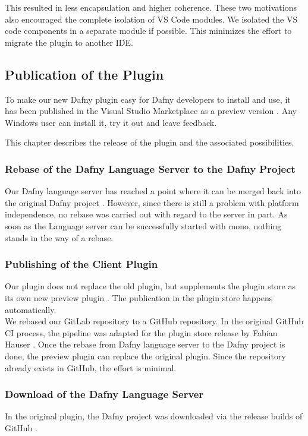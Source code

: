 This resulted in less encapsulation and higher coherence.
These two motivations also encouraged the complete isolation of VS Code modules.
We isolated the VS code components in a separate module if possible.
This minimizes the effort to migrate the plugin to another IDE.

\subsection{Publication of the Plugin}
To make our new Dafny plugin easy for Dafny developers to install and use,
it has been published in the Visual Studio Marketplace as a preview version \cite{our-dafny-plugin}.
Any Windows user can install it, try it out and leave feedback.

This chapter describes the release of the plugin and the associated possibilities.

\subsubsection{Rebase of the Dafny Language Server to the Dafny Project}
Our Dafny language server has reached a point where it can be merged back into the original Dafny project \cite{dafny_lang_github}.
However, since there is still a problem with platform independence, no rebase was carried out with regard to the server in part.
As soon as the Language server can be successfully started with mono, nothing stands in the way of a rebase.

\subsubsection{Publishing of the Client Plugin}
Our plugin does not replace the old plugin, but supplements the plugin store as its own new preview plugin \cite{our-dafny-plugin}.
The publication in the plugin store happens automatically. \\

We rebased our GitLab repository to a GitHub repository.
In the original GitHub CI process, the pipeline 
was adapted for the plugin store release by Fabian Hauser \cite{our-dafny-plugin-github-publish}.
Once the rebase from Dafny language server to the Dafny project is done,
the preview plugin can replace the original plugin.
Since the repository already exists in GitHub, the effort is minimal.

\subsubsection{Download of the Dafny Language Server}
In the original plugin, the Dafny project was downloaded via the release builds of GitHub \cite{dafny_lang_builds}.

